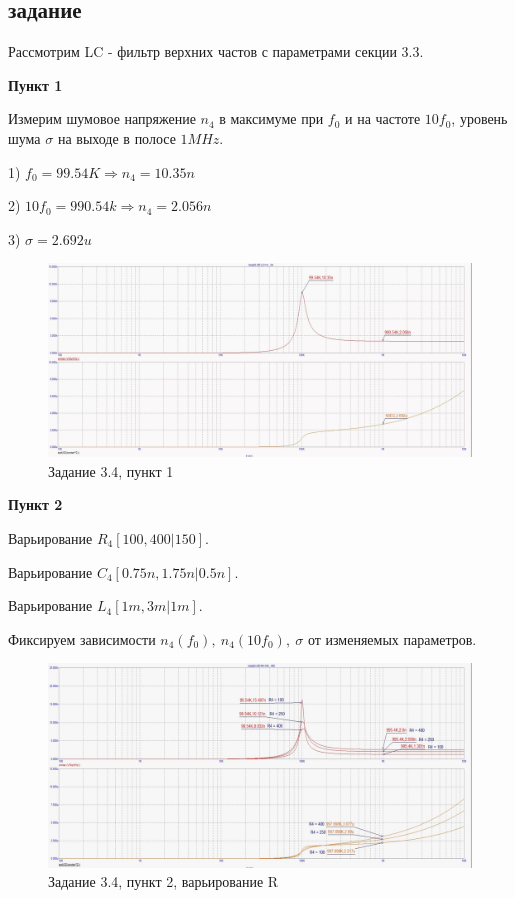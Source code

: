 \documentclass[a4paper, 14pt]{extarticle}%
\begin{document}
\subsection{задание}

Рассмотрим LC - фильтр верхних частов с параметрами секции 3.3.


\textbf{Пункт 1}


Измерим шумовое напряжение $n_4$ в максимуме при $f_0$ и на частоте $10f_0$, уровень шума $\sigma$ на выходе в полосе $1MHz$.

1) $f_0 = 99.54K \Rightarrow n_4 = 10.35n $

2) $10f_0 = 990.54k \Rightarrow n_4 = 2.056n$

3) $\sigma = 2.692u$


\begin{figure}[h!]
			\centering
			\includegraphics[width=1.1\linewidth]{3/3_3_6.jpg}
			\caption{Задание 3.4, пункт 1}
			\label{A}
\end{figure}

\textbf{Пункт 2}

Варьирование $R_4[100, 400 | 150]$.

Варьирование $C_4[0.75n, 1.75n | 0.5n]$.

Варьирование $L_4[1m, 3m | 1m]$.

Фиксируем зависимости $n_4(f_0), \: n_4(10f_0), \: \sigma$ от изменяемых параметров.

\begin{figure}[h!]
			\centering
			\includegraphics[width=1.1\linewidth]{3/3_4_3.jpg}
			\caption{Задание 3.4, пункт 2, варьирование R}
			\label{A}
\end{figure}
\end{document}
